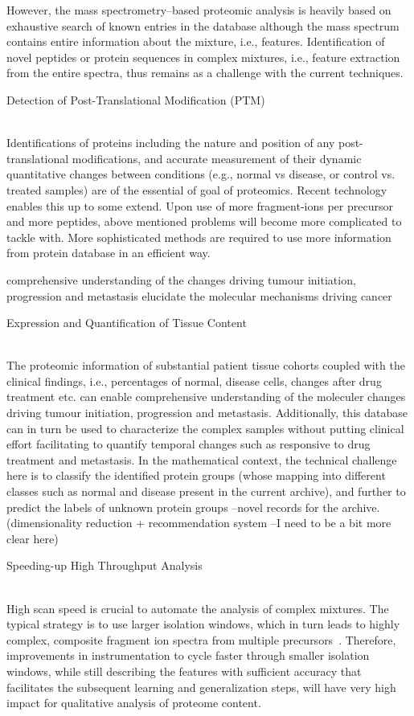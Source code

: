 \documentclass{nature}
\begin{document}
\begin{enumerate}
    However, the mass spectrometry--based proteomic analysis is heavily based on exhaustive search of known entries in the database although the mass spectrum contains entire information about the mixture, i.e., features. Identification of novel peptides or protein sequences in complex mixtures, i.e., feature extraction from the entire spectra, thus remains as a challenge with the current techniques. 
    
    {\bf \item Detection of Post-Translational Modification (PTM)}\\
    Identifications of proteins including the nature and position of any post-translational modifications, and accurate measurement of their dynamic quantitative changes between conditions (e.g., normal vs disease, or control vs. treated samples) are of the essential of goal of proteomics. Recent technology enables this up to some extend. Upon use of more fragment-ions per precursor and more peptides, above mentioned problems will become more complicated to tackle with. More sophisticated methods are required to use more information from protein database in an efficient way.
    
    comprehensive understanding of the changes driving tumour initiation, progression and metastasis
    elucidate the molecular mechanisms driving cancer
    
    {\bf \item Expression and Quantification of Tissue Content}\\
    The proteomic information of substantial patient tissue cohorts coupled with the clinical findings, i.e., percentages of normal, disease cells, changes after drug treatment etc. can enable comprehensive understanding of the moleculer changes driving tumour initiation, progression and metastasis. Additionally, this database can in turn be used to characterize the complex samples without putting clinical effort facilitating to quantify temporal changes such as responsive to drug treatment and metastasis. In the mathematical context, the technical challenge here is to classify the identified protein groups (whose mapping into different classes such as normal and disease present in the current archive), and further to predict the labels of unknown protein groups --novel records for the archive. (dimensionality reduction + recommendation system --I need to be a bit more clear here)

    {\bf \item Speeding-up High Throughput Analysis}\\   
    High scan speed is crucial to automate the analysis of complex mixtures. The typical strategy is to use larger isolation windows, which in turn leads to highly complex, composite fragment ion spectra from multiple precursors~\cite{Gillet2016MassSA}. Therefore, improvements in instrumentation to cycle faster through smaller isolation windows, while still describing the features with sufficient accuracy that facilitates the subsequent learning and generalization steps, will have very high impact for qualitative analysis of proteome content.
    

\end{enumerate}
\end{document}
